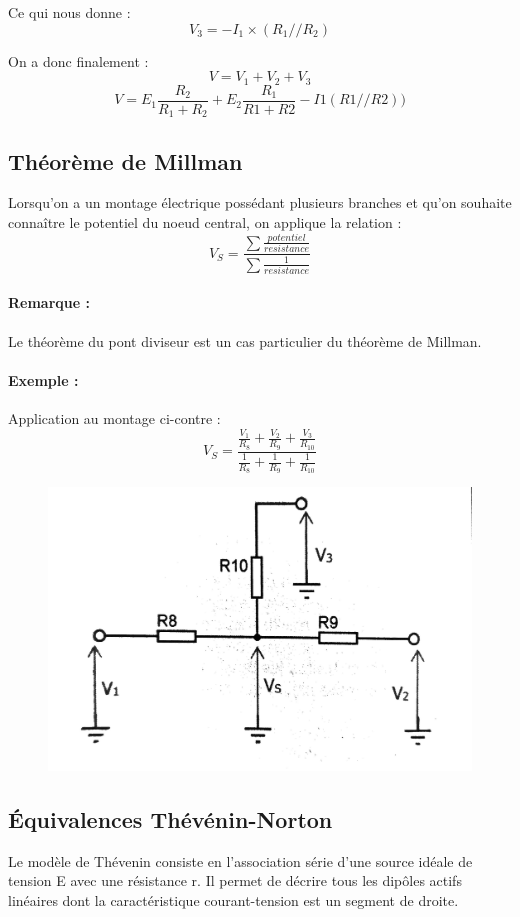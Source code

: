 \documentclass[a4paper,10pt]{article}
\begin{document}
Ce qui nous donne : $$V_3=-I_1\times (R_1//R_2)$$

On a donc finalement : $$V = V_1 + V_2 + V_3$$
$$V = E_1\frac{R_2}{R_1+R_2}+E_2\frac{R_1}{R1+R2}-I1(R1//R2))$$

\subsection{Théorème de Millman}
Lorsqu'on a un montage électrique possédant plusieurs branches et qu'on souhaite connaître le potentiel du noeud central, on applique la relation : $$V_S = \frac{\sum \frac{potentiel}{resistance}}{\sum \frac{1}{resistance}}$$
\paragraph{Remarque :}
Le théorème du pont diviseur est un cas particulier du théorème de Millman.

\paragraph{Exemple :}
Application au montage ci-contre : $$V_S = \frac{\frac{V_1}{R_8}+\frac{V_2}{R_9}+\frac{V_3}{R_10}}{\frac{1}{R_8}+\frac{1}{R_9}+\frac{1}{R_10}}$$
\begin{figure}[h]
 \begin{center}
  \includegraphics[width=\textwidth]{millman}
 \end{center}
\end{figure}
\subsection{Équivalences Thévénin-Norton}
Le modèle de Thévenin consiste en l’association série d’une source idéale de tension E avec
une résistance r. Il permet de décrire tous les dipôles actifs linéaires dont la caractéristique
courant-tension est un segment de droite.
\end{document}
